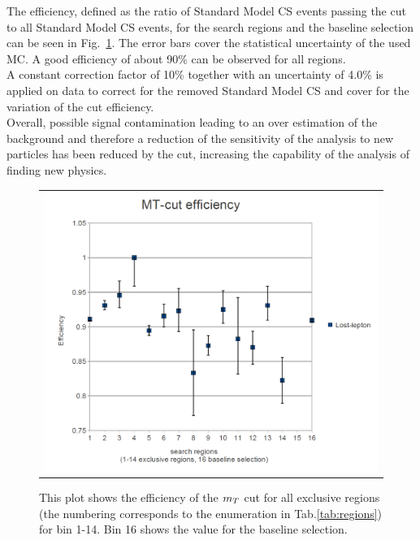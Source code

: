 The efficiency, defined as the ratio of Standard Model CS events passing the cut to all Standard Model CS events, for the search regions and the baseline selection can be seen in Fig.~\ref{fig:mt_cut_eff}. The error bars cover the statistical uncertainty of the used MC. A good efficiency of about 90\% can be observed for all regions.\\
A constant correction factor of 10\% together with an uncertainty of 4.0\% is applied on data to correct for the removed Standard Model CS and cover for the variation of the cut efficiency.\\
Overall, possible signal contamination leading to an over estimation of the background and therefore a reduction of the sensitivity of the analysis to new particles has been reduced by the \mt cut, increasing the capability of the analysis of finding new physics.
\begin{figure}[tbhn]
\begin{center}
\begin{tabular}{c}
\includegraphics[width=1\textwidth]{lostlepton/plots/MT_eff.png}\\
\end{tabular}
\end{center}
\caption{This plot shows the efficiency of the $m_{T}$ cut for all exclusive regions (the numbering corresponds to the enumeration in Tab.\ref{tab:regions}) for bin 1-14. Bin 16 shows the value for the baseline selection. }
\label{fig:mt_cut_eff}
\end{figure}



